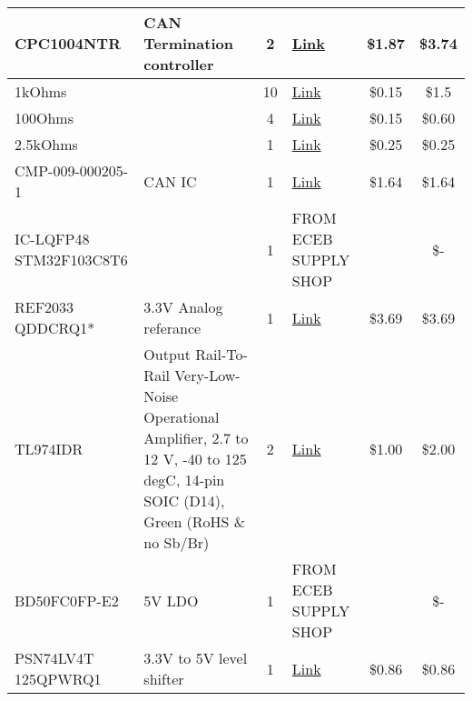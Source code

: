 \begin{xltabular}{\textwidth} {|X|X|c|X|c|c|}

    \hline
    CPC1004NTR & CAN Termination controller & 2 & \href{https://www.digikey.com/en/products/detail/ixys-integrated-circuits-division/CPC1004NTR/655298}{Link} & \$1.87 & \$3.74 \\

    \hline
    1kOhms & & 10 & \href{https://www.mouser.com/ProductDetail/Panasonic/ERJ-PA3F1001V?qs=gPaRPY8qCzMc40IhqxJeOQ\%3D\%3D\&utm_id=177953176\&gad_source=1\&gclid=Cj0KCQjw0MexBhD3ARIsAEI3WHK5iJyqcUCl9Si_ZGJNqQJbUBFLL_WoWEJ43XCjnAYT3Ko9kjddS1saAqqjEALw_wcB}{Link} & \$0.15 & \$1.5 \\

    \hline
    100Ohms & & 4 & \href{https://www.mouser.com/ProductDetail/Panasonic/ERJ-UP3J201V?qs=GedFDFLaBXFArcjGPzXiOQ\%3D\%3D}{Link} & \$0.15 & \$0.60 \\

    \hline
    2.5kOhms & & 1 & \href{https://www.mouser.com/ProductDetail/Panasonic/ERJ-PB3B2491V?qs=RYIBGgAklzIM7lNSKOU\%252Bzw\%3D\%3D}{Link} & \$0.25 & \$0.25 \\

    \hline
    CMP-009-000205-1 & CAN IC & 1 & \href{https://www.digikey.com/en/products/detail/TCAN1044AEVDRQ1/296-TCAN1044AEVDRQ1CT-ND/18787167?curr=usd\&utm_campaign=buynow\&utm_medium=aggregator\&utm_source=octopart}{Link} & \$1.64 & \$1.64 \\

    \hline
    IC-LQFP48 STM32F103C8T6 & & 1 & FROM ECEB SUPPLY SHOP & & \$- \\

    \hline
    REF2033 QDDCRQ1* & 3.3V Analog referance & 1 & \href{https://www.digikey.com/en/products/detail/texas-instruments/REF2033QDDCRQ1/15926650}{Link} & \$3.69 & \$3.69 \\

    \hline
    TL974IDR & Output Rail-To-Rail Very-Low-Noise Operational Amplifier, 2.7 to 12 V, -40 to 125 degC, 14-pin SOIC (D14), Green (RoHS \& no Sb/Br) & 2 & \href{https://www.digikey.com/en/products/detail/texas-instruments/TL974IDR/1560257}{Link} & \$1.00 & \$2.00 \\

    \hline
    BD50FC0FP-E2 & 5V LDO & 1 & FROM ECEB SUPPLY SHOP & & \$- \\

    \hline
    PSN74LV4T 125QPWRQ1 & 3.3V to 5V level shifter & 1 & \href{https://www.mouser.com/ProductDetail/Texas-Instruments/SN74LV4T125PWR?qs=\%2Fd\%252BFzHvH4c3\%252BiZGZ\%252Bu8B9g\%3D\%3D\&utm_source=octopart\&utm_medium=aggregator\&utm_campaign=595-SN74LV4T125PWR\&utm_content=Texas\%20Instruments}{Link} & \$0.86 & \$0.86 \\

    \hline
\end{xltabular}


